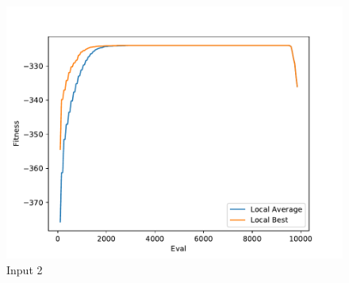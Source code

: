 \documentclass{standalone}
\begin{document}
\begin{figure}[!htb]
	\caption{Input 2}
	\label{fig:graph_2059}
	\includegraphics[width=\textwidth]{../graphs/graphs/2059.pdf}
\end{figure}
\end{document}
